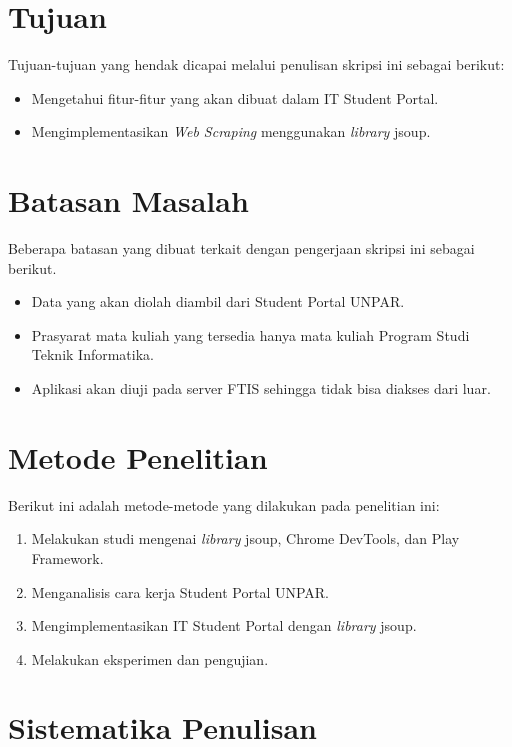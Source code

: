 \section{Tujuan}
\label{sec:tujuan}

Tujuan-tujuan yang hendak dicapai melalui penulisan skripsi ini sebagai berikut:
\begin{itemize}
	\item	Mengetahui fitur-fitur yang akan dibuat dalam IT Student Portal.
	\item	Mengimplementasikan \textit{Web Scraping} menggunakan \textit{library} jsoup.
\end{itemize}

\section{Batasan Masalah}
\label{sec:batasan_masalah}

Beberapa batasan yang dibuat terkait dengan pengerjaan skripsi ini sebagai berikut.
\begin{itemize}
	\item Data yang akan diolah diambil dari Student Portal UNPAR.
	\item Prasyarat mata kuliah yang tersedia hanya mata kuliah Program Studi Teknik Informatika.
	\item Aplikasi akan diuji pada server FTIS sehingga tidak bisa diakses dari luar.
\end{itemize}

\section{Metode Penelitian}
\label{sec:metode_penelitian}

Berikut ini adalah metode-metode yang dilakukan pada penelitian ini:

\begin{enumerate}
	\item Melakukan studi mengenai \textit{library} jsoup, Chrome DevTools, dan Play Framework.
	\item Menganalisis cara kerja Student Portal UNPAR.
	\item Mengimplementasikan IT Student Portal dengan \textit{library} jsoup.
	\item Melakukan eksperimen dan pengujian.
\end{enumerate}

\section{Sistematika Penulisan}
\label{sec:sistematika_penulisan}

